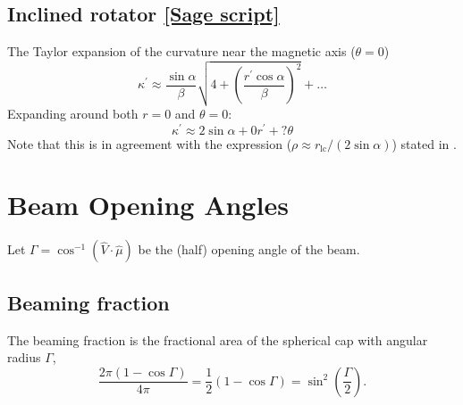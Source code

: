 \documentclass{book}
\newcommand{\rL}{r_\text{lc}} %
\newcommand{\linktosage}[1]{\hyperref[#1]{[Sage script]}}
\begin{document}
\subsection{Inclined rotator \linktosage{sage:curvature}}

The Taylor expansion of the curvature near the magnetic axis ($\theta = 0$)
\begin{equation}
    \kappa^\prime \approx \frac{\sin\alpha}{\beta}\sqrt{4 + \left(\frac{r^\prime\cos\alpha}{\beta}\right)^2} + \dots
\end{equation}
Expanding around both $r = 0$ and $\theta = 0$:
\begin{equation}
   \kappa^\prime \approx 2\sin\alpha + 0r^\prime + ?\theta
\end{equation}
Note that this is in agreement with the expression ($\rho \approx \rL/(2\sin\alpha)$) stated in \citet{Thomas2007}.

\section{Beam Opening Angles}
\label{sec:beamopeningangles}

Let $\Gamma = \cos^{-1}(\hat{V}\cdot\hat{\mu})$ be the (half) opening angle of the beam.

\subsection{Beaming fraction}

The beaming fraction is the fractional area of the spherical cap with angular radius $\Gamma$,
\begin{equation}
    \frac{2\pi(1 - \cos\Gamma)}{4\pi}
        = \frac12 (1 - \cos\Gamma)
        = \sin^2\left(\frac{\Gamma}{2}\right).
\end{equation}
\end{document}
